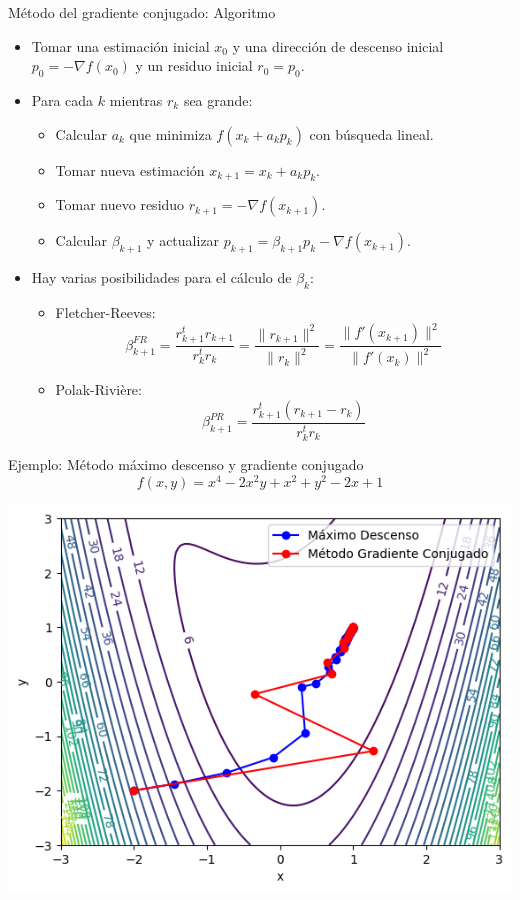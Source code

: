 \documentclass[a4paper,10pt]{beamer}
\begin{document}
\begin{frame}{Método del gradiente conjugado: Algoritmo}

	\begin{itemize}
		\item Tomar una estimación inicial $x_0$ y una dirección de descenso inicial $p_0=-\nabla f(x_0)$ y un residuo inicial $r_0=p_0$.
		\item Para cada $k$ mientras $r_{k}$ sea grande:
		\begin{itemize}
			\item Calcular $a_k$ que minimiza $f(x_k + a_k p_k)$ con búsqueda lineal.
			\item Tomar nueva estimación $x_{k+1} = x_k + a_k p_k$.
			\item Tomar nuevo residuo $r_{k+1} = - \nabla f(x_{k+1})$.
			\item Calcular $\beta_{k+1}$ y actualizar $p_{k+1} = \beta_{k+1} p_k - \nabla f(x_{k+1})$.
		\end{itemize}
		\pause
		\item Hay varias posibilidades para el cálculo de $\beta_k$:
		\begin{itemize}
		\item Fletcher-Reeves:
		\[\beta_{k+1}^{FR} = \frac{r^t_{k+1} r_{k+1}}{r^t_k r_k} = \frac{\|r_{k+1}\|^2}{\|r_k\|^2} = \frac{\|f'(x_{k+1})\|^2}{\|f'(x_k)\|^2} \]
		\item Polak-Rivière:
		\[\beta_{k+1}^{PR} = \frac{r^t_{k+1} (r_{k+1}-r_k)}{r^t_k r_k} \]
		\end{itemize}
	\end{itemize}
\end{frame}

\begin{frame}{Ejemplo: Método máximo descenso y gradiente conjugado}
	\[ f(x,y) = x^4 - 2x^2y + x^2+ y^2-2x + 1 \]


	\begin{center}
	\includegraphics[scale=0.5]{metodos.png}
	\end{center}
\end{frame}
\end{document}
